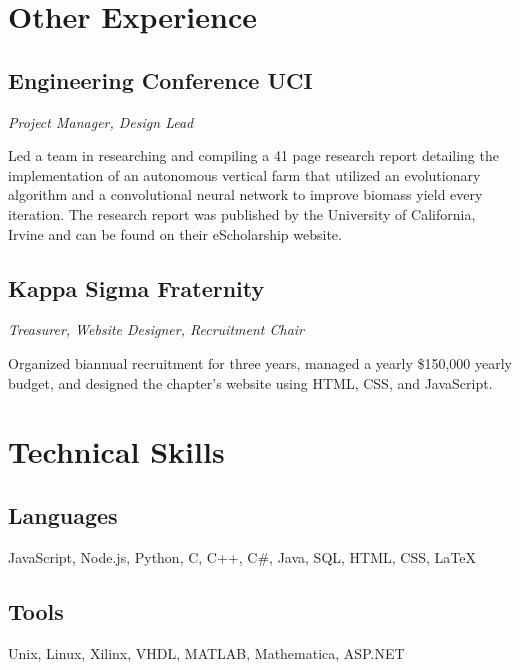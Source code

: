 \documentclass{article}
\begin{document}
\section{Other Experience}

\subsection{Engineering Conference UCI}

\noindent\textit{Project Manager, Design Lead}

Led a team in researching and compiling a 41 page research report detailing the implementation of an 
autonomous vertical farm that utilized an evolutionary algorithm and a convolutional neural network 
to improve biomass yield every iteration. The research report was published by the University of 
California, Irvine and can be found on their eScholarship website.

\subsection{Kappa Sigma Fraternity}

\noindent\textit{Treasurer, Website Designer, Recruitment Chair}

Organized biannual recruitment for three years, managed a yearly \$150,000 yearly budget, and designed 
the chapter's website using HTML, CSS, and JavaScript.

\section{Technical Skills}

\subsection{Languages}

 JavaScript, Node.js, Python, C, C++, C\#, Java, SQL, HTML, CSS, \LaTeX

\subsection{Tools}

Unix, Linux, Xilinx, VHDL, MATLAB, Mathematica, ASP.NET
\end{document}
